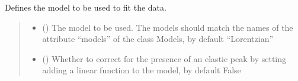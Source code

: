 \documentclass[letterpaper,10pt,english]{sphinxmanual}
\begin{document}
\begin{fulllineitems}
\begin{fulllineitems}
\label{\detokenize{source/_autosummary/HDF5_BLS_treat.Treat:HDF5_BLS_treat.Treat.define_model}}
\pysigstartsignatures
\pysiglinewithargsret
{}
{\sphinxparamcomma {}}
{}
\pysigstopsignatures
\sphinxAtStartPar
Defines the model to be used to fit the data.
\begin{quote}\begin{description}
\begin{itemize}
\item {} 
\sphinxAtStartPar
{} (\sphinxstyleliteralemphasis{\sphinxupquote{, }}) \textendash{} The model to be used. The models should match the names of the attribute “models” of the class Models, by default “Lorentzian”

\item {} 
\sphinxAtStartPar
{} (\sphinxstyleliteralemphasis{\sphinxupquote{, }}) \textendash{} Whether to correct for the presence of an elastic peak by setting adding a linear function to the model, by default False

\end{itemize}

\end{description}\end{quote}

\end{fulllineitems}



\end{fulllineitems}
\end{document}
